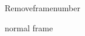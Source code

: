 \documentclass{beamer}
\begin{document}
    \begin{frame}[nonum]
        Removeframenumber
    \end{frame}

    \begin{frame}
        normal frame
    \end{frame}
\end{document}
